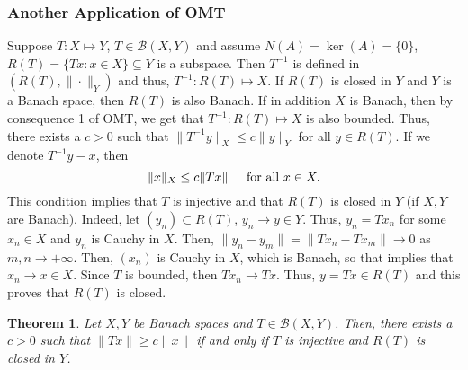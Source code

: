 \documentclass[12pt]{article}
\newtheorem{theorem}{Theorem}
\newcommand{\B}{\mathscr{B}}
\newcommand{\sbs}{\subset}
\newcommand{\sse}{\subseteq}
\begin{document}
\subsubsection*{Another Application of OMT}
\setcounter{equation}{0}
Suppose $T: X \mapsto Y$, $T \in \B(X, Y)$ and assume $N(A) = \ker(A) = \{ 0\}$, $R(T) = \{ Tx : x \in X\} \sse Y$ is a subspace. Then $T^{-1}$ is defined in $(R(T), \| \cdot \|_Y)$ and thus, $T^{-1}: R(T) \mapsto X$. If $R(T)$ is closed in $Y$ and $Y$ is a Banach space, then $R(T)$ is also Banach. If in addition $X$ is Banach, then by consequence 1  of OMT, we get that $T^{-1}: R(T) \mapsto X$ is also bounded. Thus, there exists a $c > 0$ such that $\| T^{-1} y \|_{X} \leq c \| y\|_Y$ for all $y \in R(T)$. If we denote $T^{-1}y - x$, then 
\begin{equation}
\| x \|_X \leq c \| Tx \| \hspace{4mm} \text{ for all } x \in X.
\end{equation}
This condition implies that $T$ is injective and that $R(T)$ is closed in $Y$ (if $X, Y$ are Banach). Indeed, let $(y_n) \sbs R(T)$, $y_n \to y \in Y$. Thus, $y_n = Tx_n$ for some $x_n \in X$ and $y_n$ is Cauchy in $X$. Then, $\| y_n - y_m \| = \| T x_n - Tx_m \| \to 0$ as $m, n \to + \infty$. Then, $(x_n)$ is Cauchy in $X$, which is Banach, so that implies that $x_n \to x \in X$. Since $T$ is bounded, then $T x_n \to Tx$. Thus, $y = Tx \in R(T)$ and this proves that $R(T)$ is closed. 
\begin{theorem}
Let $X, Y$ be Banach spaces and $T \in \B(X,Y)$. Then, there exists a $c >0 $ such that $\| Tx \| \geq c \| x \|$ if and only if $T$ is injective and $R(T)$ is closed in $Y$. 
\end{theorem}
\end{document}
